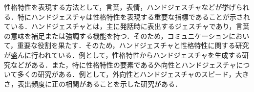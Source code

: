性格特性を表現する方法として，言葉，表情，ハンドジェスチャなどが挙げられる．特にハンドジェスチャは性格特性を表現する重要な指標であることが示されている\cite{ハンドジェスチャ指標1}\cite{ハンドジェスチャ指標2}\cite{ハンドジェスチャ指標3}．ハンドジェスチャとは，主に発話時に表出するジェスチャであり，言葉の意味を補足または強調する機能を持つ\cite{ハンドジェスチャ強調}．そのため，コミュニケーションにおいて，重要な役割を果たす．そのため，ハンドジェスチャと性格特性に関する研究が盛んに行われている．例として，性格特性からハンドジェスチャを生成する研究などがある\cite{ジェスチャ生成}．また，特に性格特性の要素である外向性とハンドジェスチャについて多くの研究がある．例として，外向性とハンドジェスチャのスピード，大きさ，表出頻度に正の相関があることを示した研究がある\cite{ジェスチャ生成}\cite{ハンドジェスチャ指標1}\cite{ハンドジェスチャ指標3}\cite{ハンドジェスチャ外向性}．












\vspace{1cm}
\begin{figure}[!h]
 \begin{center}
  \centering
  \label{fig:kansei}
 \end{center}
\end{figure}

